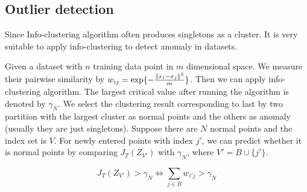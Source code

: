 \documentclass{article}
\begin{document}
\subsection{Outlier detection}
Since Info-clustering algorithm often produces singletons as a cluster. It is very suitable to apply info-clustering to detect anomaly in datasets.

Given a dataset with $n$ training data point in $m$ dimensional space. We measure their pairwise similarity by $w_{ij} = \exp\{-\frac{\lVert x_i - x_j\rVert^2}{m}\} $. Then we can apply info-clustering algorithm. The largest critical value after running the algorithm is denoted by $\gamma_N$. We select the clustering result corresponding to last by two partition with the largest cluster as normal points and the others as anomaly (usually they are just singletons).
Suppose there are $N$ normal points and the index set is $V$. For newly entered points with index $j'$, we can predict whether it is normal points by comparing $J_T(Z_{V'})$ with $\gamma_N$, where $V' = B\cup \{j'\}$.
\begin{proposition}
\begin{equation}
J_{T}(Z_{V'}) > \gamma_N \iff  \sum_{j \in B} w_{i'j} > \gamma_N 
\end{equation}
\end{proposition}	
\end{document}
